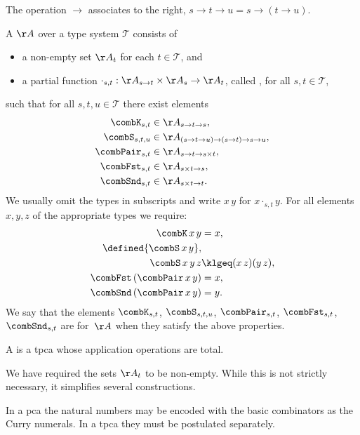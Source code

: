 The operation $\to$ associates to the right, $s \to t \to u = s \to (t \to u)$.

\begin{definition}
  A  $\AA$ over a type system $\mathcal{T}$ consists of
  \begin{itemize}
  \item a non-empty set $\AA_t$ for each $t \in \mathcal{T}$, and
  \item a partial function $\cdot_{s,t} : \AA_{s \to t} \times \AA_s \to
    \AA_t$, called , for all $s, t \in \mathcal{T}$,
  \end{itemize}
  such that for all $s, t, u \in \mathcal{T}$ there exist elements
  \begin{align*}
    \combK_{s,t} &\in \AA_{s \to t \to s}, \\
    \combS_{s,t,u} &\in \AA_{(s \to t \to u) \to (s \to t) \to s \to u}, \\
    \combPair_{s,t} &\in \AA_{s \to t \to s \times t}, \\
    \combFst_{s,t} &\in \AA_{s \times t \to s}, \\
    \combSnd_{s,t} &\in \AA_{s \times t \to t}.
  \end{align*}
  We usually omit the types in subscripts and write $x \, y$ for $x \cdot_{s,t} y$.
  For all elements $x, y, z$ of the appropriate types we require:
  \begin{align*}
    \combK \, x \, y &= x, \\
    \defined{\combS \, x \, y}, & \\
    \combS \, x \, y \, z &\klgeq  (x \, z) (y \, z), \\
    \combFst \, (\combPair \, x \, y) &= x, \\
    \combSnd \, (\combPair \, x \, y) &= y.
  \end{align*}
  We say that the elements $\combK_{s,t}$, $\combS_{s,t,u}$,
  $\combPair_{s,t}$, $\combFst_{s,t}$, $\combSnd_{s,t}$ are
   for~$\AA$ when they satisfy the above properties.

  A  is a tpca whose application operations are total.
\end{definition}

We have required the sets $\AA_t$ to be non-empty. While this is not
strictly necessary, it simplifies several constructions.

In a pca the natural numbers may be encoded with the basic combinators as the Curry numerals. In a tpca they must be postulated separately.

